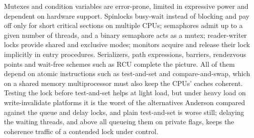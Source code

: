 \documentclass[../main.tex]{subfiles}
\begin{document}
\begin{keypoint}
  Mutexes and condition variables are error-prone, limited in expressive
  power and dependent on hardware support.  Spinlocks busy-wait instead of
  blocking and pay off only for short critical sections on multiple CPUs;
  semaphores admit up to a given number of threads, and a binary semaphore
  acts as a mutex; reader-writer locks provide shared and exclusive modes;
  monitors acquire and release their lock implicitly in entry procedures.
  Serializers, path expressions, barriers, rendezvous points and wait-free
  schemes such as RCU complete the picture.  All of them depend on atomic
  instructions such as test-and-set and compare-and-swap, which on a shared
  memory multiprocessor must also keep the CPUs' caches coherent.  Testing
  the lock before test-and-set helps at light load, but under heavy load on
  write-invalidate platforms it is the worst of the alternatives Anderson
  compared against the queue and delay locks, and plain test-and-set is
  worse still; delaying the waiting
  threads, and above all queueing them on private flags, keeps the
  coherence traffic of a contended lock under control.
\end{keypoint}
\end{document}
